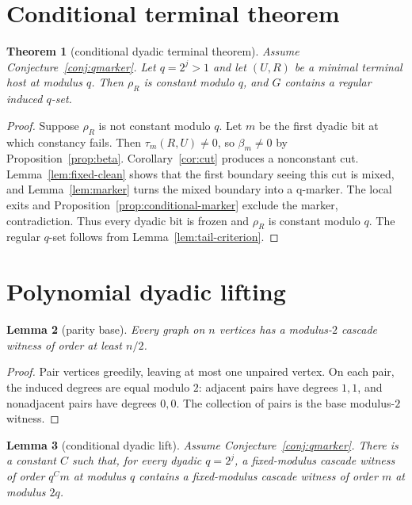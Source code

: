 \documentclass[11pt]{article}
\newtheorem{theorem}{Theorem}[section]
\newtheorem{lemma}[theorem]{Lemma}
\theoremstyle{remark}
\begin{document}
\section{Conditional terminal theorem}

\begin{theorem}[conditional dyadic terminal theorem]\label{thm:conditional-terminal}
Assume Conjecture~\ref{conj:qmarker}.  Let \(q=2^j>1\) and let \((U,R)\) be a
minimal terminal host at modulus \(q\).  Then \(\rho_R\) is constant modulo
\(q\), and \(G\) contains a regular induced \(q\)-set.
\end{theorem}

\begin{proof}
Suppose \(\rho_R\) is not constant modulo \(q\).  Let \(m\) be the first dyadic
bit at which constancy fails.  Then \(\tau_m(R,U)\ne0\), so
\(\beta_m\ne0\) by Proposition~\ref{prop:beta}.  Corollary~\ref{cor:cut}
produces a nonconstant cut.  Lemma~\ref{lem:fixed-clean} shows that the first
boundary seeing this cut is mixed, and Lemma~\ref{lem:marker} turns the mixed
boundary into a q-marker.  The local exits and
Proposition~\ref{prop:conditional-marker} exclude the marker, contradiction.
Thus every dyadic bit is frozen and \(\rho_R\) is constant modulo \(q\).  The
regular \(q\)-set follows from Lemma~\ref{lem:tail-criterion}.
\end{proof}

\section{Polynomial dyadic lifting}

\begin{lemma}[parity base]\label{lem:parity}
Every graph on \(n\) vertices has a modulus-\(2\) cascade witness of order at
least \(n/2\).
\end{lemma}

\begin{proof}
Pair vertices greedily, leaving at most one unpaired vertex.  On each pair, the
induced degrees are equal modulo \(2\): adjacent pairs have degrees \(1,1\), and
nonadjacent pairs have degrees \(0,0\).  The collection of pairs is the base
modulus-\(2\) witness.
\end{proof}

\begin{lemma}[conditional dyadic lift]\label{lem:lift}
Assume Conjecture~\ref{conj:qmarker}.  There is a constant \(C\) such that, for
every dyadic \(q=2^j\), a fixed-modulus cascade witness of order \(q^C m\) at
modulus \(q\) contains a fixed-modulus cascade witness of order \(m\) at modulus
\(2q\).
\end{lemma}
\end{document}
